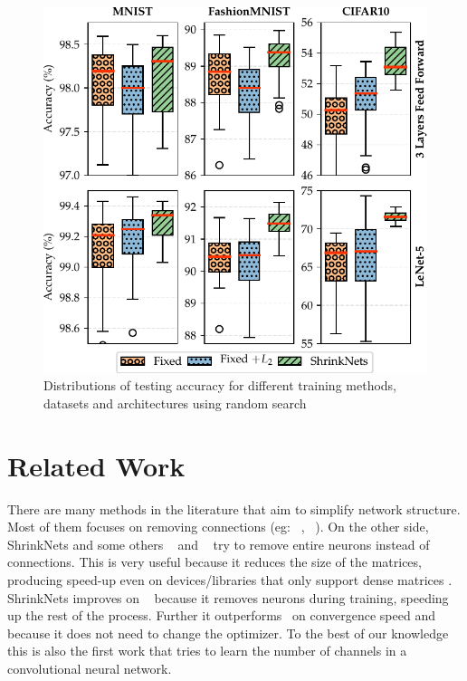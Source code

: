 \documentclass[sigconf]{acmart}
\begin{document}
\begin{figure}
\vspace{-.2in}
\begin{center}
  \includegraphics[width=\columnwidth]{hyper_opt}
  \vspace{-.2in}
\caption{Distributions of testing accuracy for different training methods, datasets and architectures using random search\label{hyper_opt_res}}
\vspace{-.2in}
\end{center}
\end{figure}

\section{Related Work}

There are many methods in the literature that aim to simplify network
structure. Most of them focuses on removing connections (eg: ~\cite{Cun},
~\cite{Han2015}). On the other side, ShrinkNets and some others
~\cite{Scardapane2017} and ~\cite{Philipp} try to remove entire neurons instead
of connections. This is very useful because it reduces the size of the matrices,
producing speed-up even on devices/libraries that only support dense matrices
. ShrinkNets improves on
~\cite{Scardapane2017} because it removes neurons during training, speeding up
the rest of the process. Further it outperforms~\cite{Philipp} on convergence
speed and because it does not need to change the optimizer. To the best of our
knowledge this is also the first work that tries to learn the number of channels
in a convolutional neural network.
\end{document}
